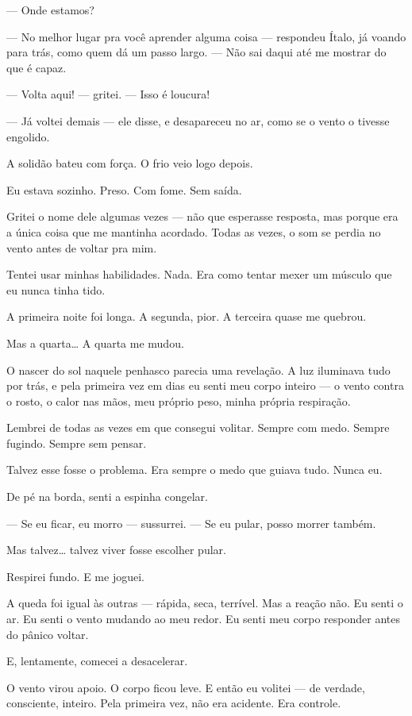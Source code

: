 — Onde estamos?

— No melhor lugar pra você aprender alguma coisa — respondeu Ítalo, já voando para trás, como quem dá um passo largo. — Não sai daqui até me mostrar do que é capaz.

— Volta aqui! — gritei. — Isso é loucura!

— Já voltei demais — ele disse, e desapareceu no ar, como se o vento o tivesse engolido.

A solidão bateu com força.  
O frio veio logo depois.

Eu estava sozinho.  
Preso.  
Com fome.  
Sem saída.

Gritei o nome dele algumas vezes — não que esperasse resposta, mas porque era a única coisa que me mantinha acordado. Todas as vezes, o som se perdia no vento antes de voltar pra mim.

Tentei usar minhas habilidades. Nada.  
Era como tentar mexer um músculo que eu nunca tinha tido.

A primeira noite foi longa.  
A segunda, pior.  
A terceira quase me quebrou.

Mas a quarta…  
A quarta me mudou.

O nascer do sol naquele penhasco parecia uma revelação. A luz iluminava tudo por trás, e pela primeira vez em dias eu senti meu corpo inteiro — o vento contra o rosto, o calor nas mãos, meu próprio peso, minha própria respiração.

Lembrei de todas as vezes em que consegui volitar.  
Sempre com medo.  
Sempre fugindo.  
Sempre sem pensar.

Talvez esse fosse o problema.  
Era sempre o medo que guiava tudo.  
Nunca eu.

De pé na borda, senti a espinha congelar.

— Se eu ficar, eu morro — sussurrei. — Se eu pular, posso morrer também.

Mas talvez…  
talvez viver fosse escolher pular.

Respirei fundo.  
E me joguei.

A queda foi igual às outras — rápida, seca, terrível.  
Mas a reação não.  
Eu senti o ar.  
Eu senti o vento mudando ao meu redor.  
Eu senti meu corpo responder antes do pânico voltar.

E, lentamente, comecei a desacelerar.

O vento virou apoio.  
O corpo ficou leve.  
E então eu volitei — de verdade, consciente, inteiro.  
Pela primeira vez, não era acidente.  
Era controle.

